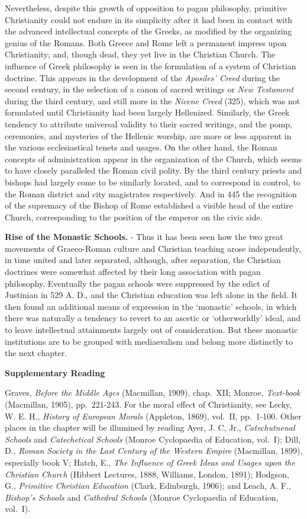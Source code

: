 \documentclass[
]{book}
\begin{document}
Nevertheless, despite this growth of opposition to pagan philosophy, primitive Christianity could not endure in its simplicity after it had been in contact with the advanced intellectual concepts of the Greeks, as modified by the organizing genius of the Romans. Both Greece and Rome left a permanent impress upon Christianity; and, though dead, they yet live in the Christian Church. The influence of Greek philosophy is seen in the formulation of a system of Christian doctrine. This appears in the development of the \emph{Aposiles' Creed} during the second century, in the selection of a canon of sacred writings or \emph{New Testament} during the third century, and still more in the \emph{Nicene Creed} (325), which was not formulated until Christianity had been largely Hellenized. Similarly, the Greek tendency to attribute universal validity to their sacred writings, and the pomp, ceremonies, and mysteries of the Hellenic worship, are more or less apparent in the various ecclesiastical tenets and usages. On the other hand, the Roman concepts of administration appear in the organization of the Church, which seems to have closely paralleled the Roman civil polity. By the third century priests and bishops had largely come to be similarly located, and to correspond in control, to the Roman district and city magistrates respectively. And in 445 the recognition of the supremacy of the Bishop of Rome established a visible head of the entire Church, corresponding to the position of the emperor on the civic side.

\textbf{Rise of the Monastic Schools.} - Thus it has been seen how the two great movements of Graeco-Roman culture and Christian teaching arose independently, in time united and later separated, although, after separation, the Christian doctrines were somewhat affected by their long association with pagan philosophy. Eventually the pagan schools were suppressed by the edict of Justinian in 529 A. D., and the Christian education was left alone in the field. It then found an additional means of expression in the `monastic' schools, in which there was naturally a tendency to revert to an ascetic or `otherworldly' ideal, and to leave intellectual attainments largely out of consideration. But these monastic institutions are to be grouped with mediaevalism and belong more distinctly to the next chapter.

\textbf{Supplementary Reading}

Graves, \emph{Before the Middle Ages} (Macmillan, 1909), chap.~XII; Monroe, \emph{Text-book} (Macmillan, 1905), pp.~221-243. For the moral effect of Christianity, see Lecky, W. E. H., \emph{History of European Morals} (Appleton, 1869), vol.~II, pp.~1-100. Other places in the chapter will be illumined by reading Ayer, J. C, Jr., \emph{Catechutnenal Schools} and \emph{Catechetical Schools} (Monroe Cyclopaedia of Education, vol.~I); Dill, D., \emph{Roman Society in the Last Century of the Western Empire} (Macmillan, 1899), especially book V; Hatch, E., \emph{The Influence of Greek Ideas and Usages upon the Christian Church} (Hibbert Lectures, 1888, Williams, London, 1891); Hodgson, G., \emph{Primitive Christian Education} (Clark, Edinburgh, 1906); and Leach, A. F., \emph{Bishop's Schools} and \emph{Cathedral Schools} (Monroe Cyclopaedia of Education, vol.~I).
\end{document}
